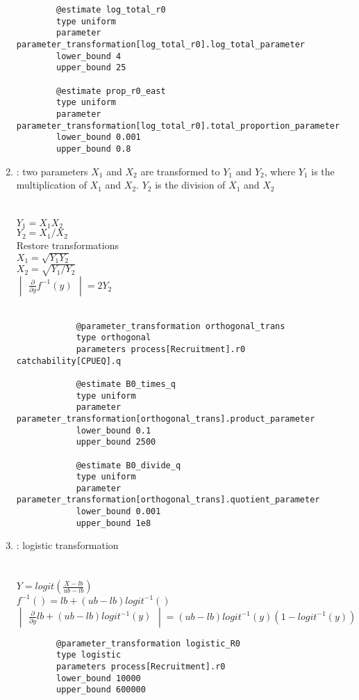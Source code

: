 \begin{enumerate}
{{\begin{verbatim}
		@estimate log_total_r0
		type uniform
		parameter parameter_transformation[log_total_r0].log_total_parameter
		lower_bound 4
		upper_bound 25
		
		@estimate prop_r0_east
		type uniform
		parameter parameter_transformation[log_total_r0].total_proportion_parameter
		lower_bound 0.001
		upper_bound 0.8		
		\end{verbatim}}}
	
\item {} : two parameters $X_1$ and $X_2$ are transformed to $Y_1$ and $Y_2$, where $Y_1$ is the multiplication of $X_1$ and $X_2$. $Y_2$ is the division of $X_1$ and $X_2$\\
\\
\\
$Y_1 = X_1 X_2$\\
$Y_2 = X_1 / X_2$\\
Restore transformations\\
$X_1 = \sqrt{Y_1 Y_2}$\\
$X_2 = \sqrt{Y_1 / Y_2}$\\
$\begin{vmatrix} \frac{\partial}{\partial y} f^{-1}(y) \end{vmatrix} = 2Y_2$\\\\
\label{sec:Transformation-Orthogonal}

{\small{\begin{verbatim}
			@parameter_transformation orthogonal_trans
			type orthogonal
			parameters process[Recruitment].r0 catchability[CPUEQ].q
			
			@estimate B0_times_q
			type uniform
			parameter parameter_transformation[orthogonal_trans].product_parameter
			lower_bound 0.1
			upper_bound 2500
			
			@estimate B0_divide_q
			type uniform
			parameter parameter_transformation[orthogonal_trans].quotient_parameter
			lower_bound 0.001
			upper_bound 1e8	
\end{verbatim}}}

\item {}  : logistic transformation\\
\\
\\
$Y = logit(\frac{X - lb}{ub - lb})$\\
$f^{-1}() = lb +(ub - lb)  logit^{-1}()$
\[
 \begin{vmatrix} \frac{\partial}{\partial y}   lb +(ub - lb)  logit^{-1}(y) \end{vmatrix} =  (ub - lb)logit^{-1}(y)\left(1 - logit^{-1}(y)\right) 
\]
\label{sec:Transformation-Logistic}
{\small{\begin{verbatim}
		@parameter_transformation logistic_R0
		type logistic
		parameters process[Recruitment].r0
		lower_bound 10000
		upper_bound 600000
		

\end{verbatim}}}
\end{enumerate}
